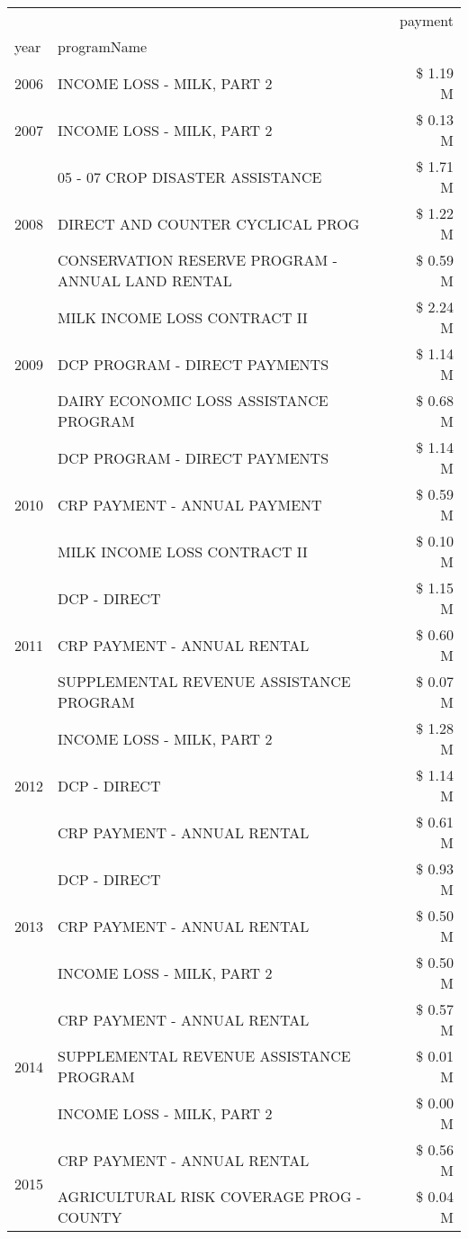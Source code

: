 \begin{tabular}{llr}
\toprule
 &  & payment \\
year & programName &  \\
\midrule
2006 & INCOME LOSS - MILK, PART 2 & \$ 1.19 M \\
\cline{1-3}
2007 & INCOME LOSS - MILK, PART 2 & \$ 0.13 M \\
\cline{1-3}
\multirow[t]{3}{*}{2008} & 05 - 07 CROP DISASTER ASSISTANCE & \$ 1.71 M \\
 & DIRECT AND COUNTER CYCLICAL PROG & \$ 1.22 M \\
 & CONSERVATION RESERVE PROGRAM - ANNUAL LAND RENTAL & \$ 0.59 M \\
\cline{1-3}
\multirow[t]{3}{*}{2009} & MILK INCOME LOSS CONTRACT II & \$ 2.24 M \\
 & DCP PROGRAM - DIRECT PAYMENTS & \$ 1.14 M \\
 & DAIRY ECONOMIC LOSS ASSISTANCE PROGRAM & \$ 0.68 M \\
\cline{1-3}
\multirow[t]{3}{*}{2010} & DCP PROGRAM - DIRECT PAYMENTS & \$ 1.14 M \\
 & CRP PAYMENT - ANNUAL PAYMENT & \$ 0.59 M \\
 & MILK INCOME LOSS CONTRACT II & \$ 0.10 M \\
\cline{1-3}
\multirow[t]{3}{*}{2011} & DCP - DIRECT & \$ 1.15 M \\
 & CRP PAYMENT - ANNUAL RENTAL & \$ 0.60 M \\
 & SUPPLEMENTAL REVENUE ASSISTANCE PROGRAM & \$ 0.07 M \\
\cline{1-3}
\multirow[t]{3}{*}{2012} & INCOME LOSS - MILK, PART 2 & \$ 1.28 M \\
 & DCP - DIRECT & \$ 1.14 M \\
 & CRP PAYMENT - ANNUAL RENTAL & \$ 0.61 M \\
\cline{1-3}
\multirow[t]{3}{*}{2013} & DCP - DIRECT & \$ 0.93 M \\
 & CRP PAYMENT - ANNUAL RENTAL & \$ 0.50 M \\
 & INCOME LOSS - MILK, PART 2 & \$ 0.50 M \\
\cline{1-3}
\multirow[t]{3}{*}{2014} & CRP PAYMENT - ANNUAL RENTAL & \$ 0.57 M \\
 & SUPPLEMENTAL REVENUE ASSISTANCE PROGRAM & \$ 0.01 M \\
 & INCOME LOSS - MILK, PART 2 & \$ 0.00 M \\
\cline{1-3}
\multirow[t]{3}{*}{2015} & CRP PAYMENT - ANNUAL RENTAL & \$ 0.56 M \\
 & AGRICULTURAL RISK COVERAGE PROG - COUNTY & \$ 0.04 M \\

\end{tabular}
